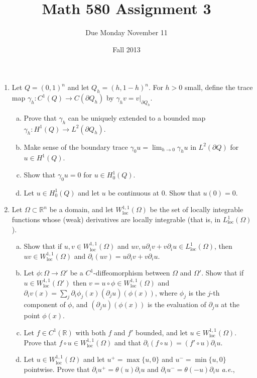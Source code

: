 \documentclass[11pt]{amsart}
\title{Math 580 Assignment 3}
\author{Due Monday November 11}
\date{Fall 2013}                                           %
\newcommand{\R}{\mathbb{R}}
\newcommand{\loc}{\mathrm{loc}}
\begin{document}
\maketitle

\begin{enumerate}[1.]
\item
Let $Q=(0,1)^n$ and let $Q_h=(h,1-h)^n$.
For $h>0$ small, define the trace map $\gamma_h:C^1(Q)\to C(\partial Q_h)$ by $\gamma_h v = v|_{\partial Q_h}$.
\begin{enumerate}[a)]
\item
Prove that $\gamma_h$ can be uniquely extended to a bounded map $\gamma_h:H^1(Q)\to L^2(\partial Q_h)$.
\item
Make sense of the boundary trace $\displaystyle\gamma_0u=\lim_{h\to0}\gamma_hu$ in $L^2(\partial Q)$ for $u\in H^1(Q)$.
\item
Show that $\gamma_0u=0$ for $u\in H^1_0(Q)$.
\item
Let $u\in H^1_0(Q)$ and let $u$  be continuous at $0$.
Show that $u(0)=0$.
\end{enumerate}
\item
Let $\Omega\subset\R^n$ be a domain, and let $W^{1,1}_\loc(\Omega)$ be the set of locally integrable functions whose (weak) derivatives are locally integrable (that is, in $L^1_\loc(\Omega)$).
\begin{enumerate}[a)]
\item%
Show that if $u,v\in W^{1,1}_\loc(\Omega)$ and $uv,u\partial_iv+v\partial_iu\in L^{1}_\loc(\Omega)$, 
then $uv\in W^{1,1}_\loc(\Omega)$ and $\partial_i(uv)=u\partial_iv+v\partial_iu$.
\item%
Let $\phi:\Omega\to\Omega'$ be a $C^1$-diffeomorphism between $\Omega$ and $\Omega'$.
Show that if $u\in W^{1,1}_\loc(\Omega')$ then $v=u\circ\phi\in W^{1,1}_\loc(\Omega)$ and
$\partial_iv(x) = \sum_j\partial_i\phi_j(x)(\partial_ju)(\phi(x))$, where $\phi_j$ is the $j$-th component of $\phi$, 
and $(\partial_ju)(\phi(x))$ is the evaluation of $\partial_ju$ at the point $\phi(x)$.
\item%
Let $f\in C^1(\R)$ with both $f$ and $f'$ bounded, and let $u\in W^{1,1}_\loc(\Omega)$.
Prove that $f\circ u \in W^{1,1}_\loc(\Omega)$ and that $\partial_i (f\circ u) = (f'\circ u) \partial_i u$.
\item%
Let $u\in W^{1,1}_\loc(\Omega)$ and let $u^+=\max\{u,0\}$ and $u^-=\min\{u,0\}$ pointwise.
Prove that $\partial_iu^+=\theta(u) \partial_iu$ and $\partial_iu^-=\theta(-u) \partial_iu$ {\em a.e.},

\end{enumerate}
\end{enumerate}
\end{document}
